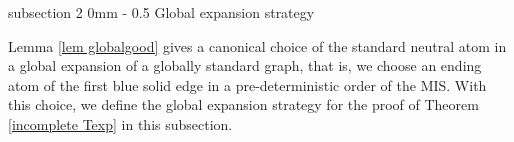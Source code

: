 \documentclass{article}
\makeatletter
\newcommand{\1}{\mathds{1}}
\numberwithin{equation}{section}
\renewcommand{\leq}{\leqslant}
\renewcommand{\le}{\leq}
\newcommand{\N}{\mathbb{N}}
\theoremstyle{plain} %
\theoremstyle{remark}
\renewcommand{\subsection}{\@startsection
	{subsection}%
	{2}%
	{0mm}%
	{-\baselineskip}%
	{0.5\baselineskip}%
	{\normalfont\bf\itshape}} %
\makeatother
\begin{document}
\subsection{Global expansion strategy} \label{sec expandlvl40}




Lemma \ref{lem globalgood} gives a canonical choice of the standard neutral atom in a global expansion of a globally standard graph, that is, we choose an ending atom of the first blue solid edge in a pre-deterministic order of the MIS. With this choice, we define the global expansion strategy for the proof of Theorem \ref{incomplete Texp} in this subsection. 

 
\end{document}
